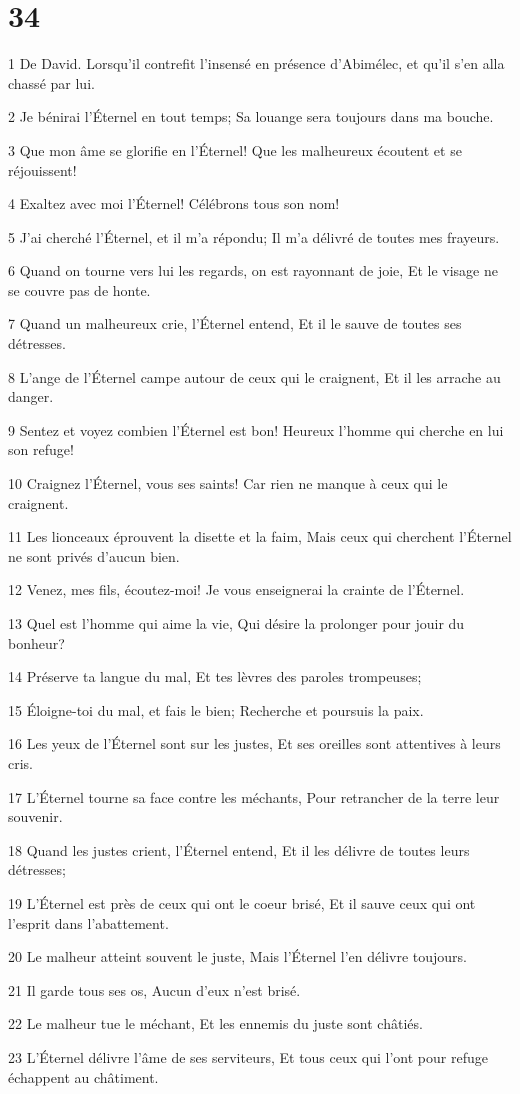 \chapter{34}

\par 1 De David. Lorsqu'il contrefit l'insensé en présence d'Abimélec, et qu'il s'en alla chassé par lui.
\par 2 Je bénirai l'Éternel en tout temps; Sa louange sera toujours dans ma bouche.
\par 3 Que mon âme se glorifie en l'Éternel! Que les malheureux écoutent et se réjouissent!
\par 4 Exaltez avec moi l'Éternel! Célébrons tous son nom!
\par 5 J'ai cherché l'Éternel, et il m'a répondu; Il m'a délivré de toutes mes frayeurs.
\par 6 Quand on tourne vers lui les regards, on est rayonnant de joie, Et le visage ne se couvre pas de honte.
\par 7 Quand un malheureux crie, l'Éternel entend, Et il le sauve de toutes ses détresses.
\par 8 L'ange de l'Éternel campe autour de ceux qui le craignent, Et il les arrache au danger.
\par 9 Sentez et voyez combien l'Éternel est bon! Heureux l'homme qui cherche en lui son refuge!
\par 10 Craignez l'Éternel, vous ses saints! Car rien ne manque à ceux qui le craignent.
\par 11 Les lionceaux éprouvent la disette et la faim, Mais ceux qui cherchent l'Éternel ne sont privés d'aucun bien.
\par 12 Venez, mes fils, écoutez-moi! Je vous enseignerai la crainte de l'Éternel.
\par 13 Quel est l'homme qui aime la vie, Qui désire la prolonger pour jouir du bonheur?
\par 14 Préserve ta langue du mal, Et tes lèvres des paroles trompeuses;
\par 15 Éloigne-toi du mal, et fais le bien; Recherche et poursuis la paix.
\par 16 Les yeux de l'Éternel sont sur les justes, Et ses oreilles sont attentives à leurs cris.
\par 17 L'Éternel tourne sa face contre les méchants, Pour retrancher de la terre leur souvenir.
\par 18 Quand les justes crient, l'Éternel entend, Et il les délivre de toutes leurs détresses;
\par 19 L'Éternel est près de ceux qui ont le coeur brisé, Et il sauve ceux qui ont l'esprit dans l'abattement.
\par 20 Le malheur atteint souvent le juste, Mais l'Éternel l'en délivre toujours.
\par 21 Il garde tous ses os, Aucun d'eux n'est brisé.
\par 22 Le malheur tue le méchant, Et les ennemis du juste sont châtiés.
\par 23 L'Éternel délivre l'âme de ses serviteurs, Et tous ceux qui l'ont pour refuge échappent au châtiment.

